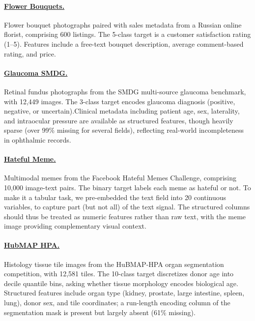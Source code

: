 \documentclass{llmxive}
\begin{document}
\paragraph{\href{https://www.kaggle.com/datasets/olgabelitskaya/flower-color-images}{Flower Bouquets.}} Flower bouquet photographs paired with sales metadata from a Russian online florist, comprising 600 listings.
The 5-class target is a customer satisfaction rating (1--5).
Features include a free-text bouquet description, average comment-based rating, and price.


\paragraph{\href{https://www.kaggle.com/datasets/deathtrooper/multichannel-glaucoma-benchmark-dataset}{Glaucoma SMDG.}} Retinal fundus photographs from the SMDG multi-source glaucoma benchmark, with 12,449 images. The 3-class target encodes glaucoma diagnosis (positive, negative, or uncertain).Clinical metadata including patient age, sex, laterality, and intraocular pressure are available as structured features, though heavily sparse (over 99\% missing for several fields), reflecting real-world incompleteness in ophthalmic records.

\paragraph{\href{https://www.kaggle.com/datasets/parthplc/facebook-hateful-meme-dataset}{Hateful Meme.}} Multimodal memes from the Facebook Hateful Memes Challenge, comprising 10,000 image-text pairs.
The binary target labels each meme as hateful or not.
To make it a tabular task, we pre-embedded the text field into 20 continuous variables, to capture part (but not all) of the text signal. The structured columns should thus be treated as numeric features rather than raw text, with the meme image providing complementary visual context.

\paragraph{\href{https://www.kaggle.com/datasets/miquel0/hubmaphba-tiled-dataset-512x512}{HubMAP HPA.}} Histology tissue tile images from the HuBMAP-HPA organ segmentation competition, with 12,581 tiles. The 10-class target discretizes donor age into decile quantile bins, asking whether tissue morphology encodes biological age.
Structured features include organ type (kidney, prostate, large intestine, spleen, lung), donor sex, and tile coordinates; a run-length encoding column of the segmentation mask is present but largely absent (61\% missing).
\end{document}
